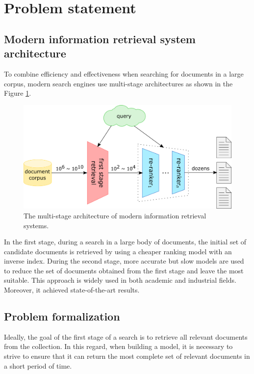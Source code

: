 \documentclass[
    twocolumn,
]{ceurart}
\begin{document}
    \section{Problem statement}

    \subsection{Modern information retrieval system architecture}

    To combine efficiency and effectiveness when searching for documents in a large corpus, modern
    search engines use multi-stage architectures as shown in the Figure \ref{fig:architecture}.
    \begin{figure}[h]
        \centering
        \includegraphics[width=\linewidth]{Architecture.png}
        \caption{The multi-stage architecture of modern information retrieval systems.}
        \label{fig:architecture}
    \end{figure}

    In the first stage, during a search in a large body of documents, the initial set of candidate
    documents is retrieved by using a cheaper ranking model with an inverse index.
    During the second stage, more accurate but slow models are used to reduce the set of
    documents obtained from the first stage and leave the most suitable.
    This approach is widely used in both academic and industrial fields.
    Moreover, it achieved state-of-the-art results.

    \subsection{Problem formalization} \label{problem-formalization}

    Ideally, the goal of the first stage of a search is to retrieve all relevant documents from the
    collection.
    In this regard, when building a model, it is necessary to strive to ensure that it can return
    the most complete set of relevant documents in a short period of time.
\end{document}
